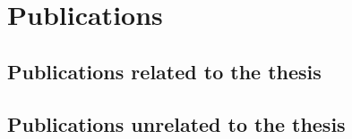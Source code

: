 \documentclass[11pt]{article}
\begin{document}
\section{Publications}
\label{sec:publications}
\subsection*{Publications related to the thesis}
\begin{refsection}
    \nocite{*}
    \printbibliography[keyword=related,heading=none]
\end{refsection}

\subsection*{Publications unrelated to the thesis}

\begin{refsection}
    \nocite{*}
    \printbibliography[keyword=unrelated,heading=none]
\end{refsection}

\begin{refsection}
    \nocite{*}
    \printbibliography[keyword=foreign]
\end{refsection}
\end{document}
